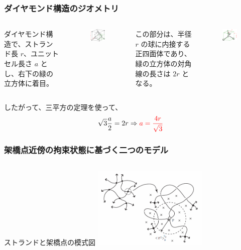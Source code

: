 \documentclass[11pt, dvipdfmx]{beamer}
\begin{document}
\begin{appendix}
\begin{frame}
\end{frame}

\begin{frame}
\frametitle{ダイヤモンド構造のジオメトリ}

\begin{columns}[T, totalwidth=1\textwidth]
ダイヤモンド構造で、ストランド長 $r$、ユニットセル長さ $a$ とし、右下の緑の立方体に着目。

\begin{figure}
\centering
\includegraphics[width=40mm]{./fig/dia_green_2.png}
\end{figure}

この部分は、半径 $r$ の球に内接する正四面体であり、緑の立方体の対角線の長さは $2r$ となる。
\begin{figure}
\centering
\includegraphics[width=40mm]{./fig/dia_mini_2.png}
\end{figure}
\end{columns}

\vspace{3mm}
\centering
したがって、三平方の定理を使って、
\vspace{-2mm}
\begin{align*}
\sqrt{3} \dfrac{a}{2} = 2r \Rightarrow {\color{red} a= \dfrac{4 r}{\sqrt{3}} }
\end{align*}
\end{frame}
\begin{frame}
\frametitle{架橋点近傍の拘束状態に基づく二つのモデル}

\begin{columns}[totalwidth=1\textwidth]
ストランドと架橋点の模式図
\includegraphics[width=55mm]{./fig/JP_vicinity.png}


\end{columns}
\end{frame}
\end{appendix}
\end{document}
